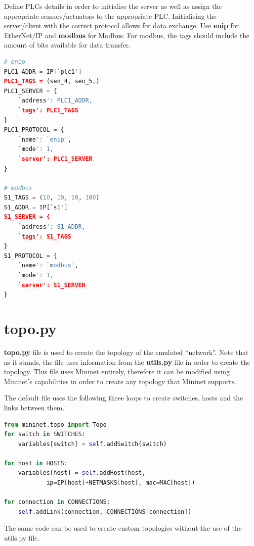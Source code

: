 \documentclass[book,a4paper,12pt]{memoir}
\begin{document}
\noindent Define PLCs details in order to initialise the server as well as assign the appropriate sensors/actuators to the appropriate PLC.  Initialising the server/client with the correct protocol allows for data exchange.  Use \textbf{enip} for EtherNet/IP and \textbf{modbus} for Modbus.  For modbus, the tags should include the amount of bits available for data transfer.

\begin{lstlisting}[backgroundcolor = \color{ultralightgray}, language = Python, xleftmargin = 0.1cm, framexleftmargin = 0.3em, showstringspaces=false]
# enip
PLC1_ADDR = IP[`plc1']
PLC1_TAGS = (sen_4, sen_5,)
PLC1_SERVER = {
    `address': PLC1_ADDR,
    `tags': PLC1_TAGS
}
PLC1_PROTOCOL = {
    `name': `enip',
    `mode': 1,
    `server': PLC1_SERVER
}

# modbus
S1_TAGS = (10, 10, 10, 100)
S1_ADDR = IP[`s1']
S1_SERVER = {
    `address': S1_ADDR,
    `tags': S1_TAGS
}
S1_PROTOCOL = {
    `name': `modbus',
    `mode': 1,
    `server': S1_SERVER
}
\end{lstlisting}


\newpage
\section{topo.py}
\label{cha:basicuse-sec:topo}
\textbf{topo.py} file is used to create the topology of the emulated ``network''.  Note that as it stands, the file uses information from the \textbf{utils.py} file in order to create the topology.  This file uses Mininet entirely, therefore it can be modified using Mininet's capabilities in order to create any topology that Mininet supports.

\noindent The default file uses the following three loops to create switches, hosts and the links between them.

\begin{lstlisting}[backgroundcolor = \color{ultralightgray}, language = Python, xleftmargin = 0.1cm, framexleftmargin = 0.3em, showstringspaces=false]
from mininet.topo import Topo
for switch in SWITCHES:
    variables[switch] = self.addSwitch(switch)

for host in HOSTS:
    variables[host] = self.addHost(host, 
            ip=IP[host]+NETMASKS[host], mac=MAC[host])

for connection in CONNECTIONS:
    self.addLink(connection, CONNECTIONS[connection])
\end{lstlisting}


\noindent The same code can be used to create custom topologies without the use of the utils.py file.
\end{document}
